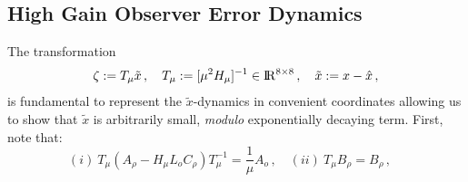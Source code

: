 \documentclass[letterpaper, 10 pt, conference]{ieeeconf}  %
\def\re{{\rm I}\! {\rm R}}
\theoremstyle{plain}
\theoremstyle{definition}
\theoremstyle{remark}
\begin{document}
\begin{footnotesize}
		\subsection{High Gain Observer Error Dynamics}

			The transformation \cite{OK:97}
			\begin{equation}
			\zeta:=T_{\mu}\tilde{x}\,, \quad T_\mu:=[\mu^2
			H_\mu]^{-1} \in \re^{8 \times 8}\,, \quad \tilde{x}:= x-\hat{x}\,,\label{eq:defT_HGO}
			\end{equation}
			is fundamental to represent the $\tilde{x}$-dynamics in 
			convenient coordinates allowing us to show that $\tilde{x}$ is
			arbitrarily small, {\em modulo} exponentially decaying term. First,
			note that:
			$$(i) \ T_\mu(A_\rho-H_\mu L_o
			C_\rho)T_\mu^{-1}\!=\!\frac{1}{\mu}A_o\,, \quad (ii) \ T_\mu B_\rho\!=\!B_\rho\,, \quad$$ 



\end{footnotesize}
\end{document}
